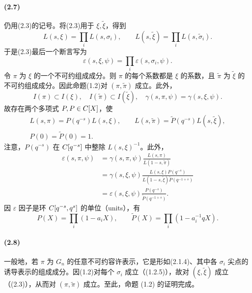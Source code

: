 \paragraph*{(2.7)} 仍用(2.3)的记号。将(2.3)用于 $\xi,\widetilde\xi$，得到
\begin{equation}
 L(s,\xi)=\prod_iL(s,\sigma_i),\qquad
 L(s,\widetilde\xi)=\prod_iL(s,\widetilde\sigma_i).\tag{2.7.1}
\end{equation}
于是(2.3)最后一个断言写为
\begin{equation}
 \varepsilon(s,\xi,\psi)=\prod_i\varepsilon(s,\sigma_i,\psi).\tag{2.7.2}
\end{equation}
令 $\pi$ 为 $\xi$ 的一个不可约组成成分。则 $\pi$ 的每个系数都是 $\xi$ 的系数，且 $\widetilde\pi$ 为 $\widetilde\xi$ 的不可约组成成分。因此命题(1.2)对 $(\pi,\widetilde\pi)$ 成立。此外，
\begin{equation}
 I(\pi)\subset I(\xi),\quad I(\widetilde\pi)\subset I(\widetilde\xi),\quad
 \gamma(s,\pi,\psi)=\gamma(s,\xi,\psi).\tag{2.7.3}
\end{equation}
故存在两个多项式 $P,P\in C[X]$，使
\begin{equation}
\begin{gathered}
 L(s,\pi)=P(q^{-s})L(s,\xi),\qquad
 L(s,\widetilde\pi)=\widetilde P(q^{-s})L(s,\widetilde\xi),\\
 P(0)=\widetilde P(0)=1.
\end{gathered}\tag{2.7.4}
\end{equation}
注意，$P(q^{-s})$ 在 $C[q^{-s}]$ 中整除 $L(s,\xi)^{-1}$。此外，
\begin{equation}
\begin{aligned}
 \varepsilon(s,\pi,\psi)
 &=\gamma(s,\pi,\psi)\frac{L(s,\pi)}{L(1-s,\widetilde\pi)}\\
 &=\gamma(s,\xi,\psi)\frac{L(s,\xi)P(q^{-s})}{L(1-s,\widetilde\xi)\widetilde P(q^{-1+s})}\\
 &=\varepsilon(s,\xi,\psi)\frac{P(q^{-s})}{\widetilde P(q^{-1+s})}.
\end{aligned}\tag{2.7.5}
\end{equation}
因 $\varepsilon$ 因子是环 $C[q^{-s},q^s]$ 的单位（units），有
\begin{equation}
 P(X)=\prod_i(1-a_iX),\qquad
 \widetilde P(X)=\prod_i(1-a_i^{-1}qX).\tag{2.7.6}
\end{equation}

\paragraph*{(2.8)} 一般地，若 $\pi$ 为 $G_n$ 的任意不可约容许表示，它是形如(2.1.4)、其中各 $\sigma_i$ 尖点的诱导表示的组成成分。因(1.2)对每个 $\sigma_i$ 成立（(1.2.5)），故对 $(\xi,\widetilde\xi)$ 成立（(2.3)），从而对 $(\pi,\widetilde\pi)$ 成立。至此，命题 (1.2) 的证明完成。



